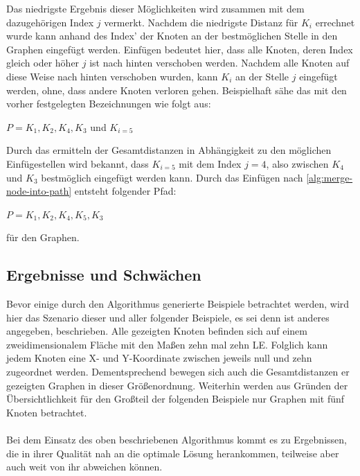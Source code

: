 Das niedrigste Ergebnis dieser Möglichkeiten wird zusammen mit dem dazugehörigen Index $j$ vermerkt. 
Nachdem die niedrigste Distanz für $K_i$ errechnet wurde kann anhand des Index' der Knoten an der bestmöglichen Stelle in den Graphen eingefügt werden. 
Einfügen bedeutet hier, dass alle Knoten, deren Index gleich oder höher $j$ ist nach hinten verschoben werden. 
Nachdem alle Knoten auf diese Weise nach hinten verschoben wurden, kann $K_i$ an der Stelle $j$ eingefügt werden, ohne, dass andere Knoten verloren gehen. 
Beispielhaft sähe das mit den vorher festgelegten Bezeichnungen wie folgt aus: 
\begin{addmargin}[1em]{2em}
$P= K_1, K_2, K_4, K_3$ und $K_{i = 5}$ 
\end{addmargin}
Durch das ermitteln der Gesamtdistanzen in Abhängigkeit zu den möglichen Einfügestellen wird bekannt, dass $K_{i=5}$ mit dem Index $j=4$, also zwischen $K_4$ und $K_3$ bestmöglich eingefügt werden kann. 
Durch das Einfügen nach \vref{alg:merge-node-into-path} entsteht folgender Pfad:
\begin{addmargin}[1em]{2em}
$P=K_1, K_2, K_4, K_5, K_3$
\end{addmargin}
für den Graphen.

\subsection{Ergebnisse und Schwächen} \label{sec:inserst-first-erg}
Bevor einige durch den Algorithmus generierte Beispiele betrachtet werden, wird hier das Szenario dieser und aller folgender Beispiele, es sei denn ist anderes angegeben, beschrieben.
Alle gezeigten Knoten befinden sich auf einem zweidimensionalem Fläche mit den Maßen zehn mal zehn \ac{LE}.
Folglich kann jedem Knoten eine X- und Y-Koordinate zwischen jeweils null und zehn zugeordnet werden. 
Dementsprechend bewegen sich auch die Gesamtdistanzen er gezeigten Graphen in dieser Größenordnung.
Weiterhin werden aus Gründen der Übersichtlichkeit für den Großteil der folgenden Beispiele nur Graphen mit fünf Knoten betrachtet.
\\\\
Bei dem Einsatz des oben beschriebenen Algorithmus kommt es zu Ergebnissen, die in ihrer Qualität nah an die optimale Lösung herankommen, teilweise aber auch weit von ihr abweichen können.  

